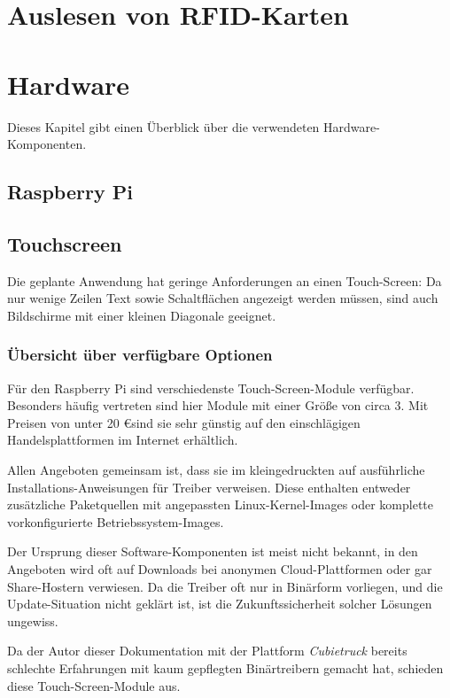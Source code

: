 \documentclass[11pt,a4paper]{IEEEtran}
\begin{document}
\section{Auslesen von RFID-Karten}
\label{sec:rfid}

\section{Hardware}
\label{sec:hw}

Dieses Kapitel gibt einen Überblick über die verwendeten Hardware-Komponenten.

\subsection{Raspberry Pi}

\subsection{Touchscreen}

Die geplante Anwendung hat geringe Anforderungen an einen Touch-Screen: Da nur
wenige Zeilen Text sowie Schaltflächen angezeigt werden müssen, sind auch 
Bildschirme mit einer kleinen Diagonale geeignet.

\subsubsection{Übersicht über verfügbare Optionen}

Für den Raspberry Pi sind verschiedenste Touch-Screen-Module verfügbar.
Besonders häufig vertreten sind hier Module mit einer Größe von circa
\SI{3}{\inch}. Mit Preisen von unter 20 \euro sind sie sehr günstig auf den
einschlägigen Handelsplattformen im Internet erhältlich.

Allen Angeboten gemeinsam ist, dass sie im kleingedruckten auf ausführliche
Installations-Anweisungen für Treiber verweisen. Diese enthalten entweder
zusätzliche Paketquellen mit angepassten Linux-Kernel-Images oder komplette
vorkonfigurierte Betriebssystem-Images. 

Der Ursprung dieser Software-Komponenten ist meist nicht bekannt, in den
Angeboten wird oft auf Downloads bei anonymen Cloud-Plattformen oder gar
Share-Hostern verwiesen. Da die Treiber oft nur in Binärform vorliegen, und 
die Update-Situation nicht geklärt ist, ist die Zukunftssicherheit solcher 
Lösungen ungewiss.

Da der Autor dieser Dokumentation mit der Plattform \emph{Cubietruck} bereits
schlechte Erfahrungen mit kaum gepflegten Binärtreibern gemacht hat, schieden
diese Touch-Screen-Module aus.
\end{document}
